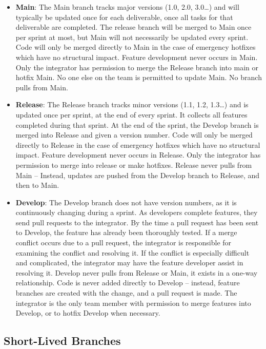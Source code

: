  \begin{itemize}
    \item \textbf{Main}:
    The Main branch tracks major versions (1.0, 2.0, 3.0…) and will typically be updated once for each deliverable, once all tasks for that deliverable are completed. The release branch will be merged to Main once per sprint at most, but Main will not necessarily be updated every sprint. Code will only be merged directly to Main in the case of emergency hotfixes which have no structural impact. Feature development never occurs in Main. Only the integrator has permission to merge the Release branch into main or hotfix Main. No one else on the team is permitted to update Main. No branch pulls from Main.
    \item \textbf{Release}:
    The Release branch tracks minor versions (1.1, 1.2, 1.3…) and is updated once per sprint, at the end of every sprint. It collects all features completed during that sprint. At the end of the sprint, the Develop branch is merged into Release and given a version number. Code will only be merged directly to Release in the case of emergency hotfixes which have no structural impact. Feature development never occurs in Release. Only the integrator has permission to merge into release or make hotfixes. Release never pulls from Main – Instead, updates are pushed from the Develop branch to Release, and then to Main.

    \item \textbf{Develop}:
    The Develop branch does not have version numbers, as it is continuously changing during a sprint. As developers complete features, they send pull requests to the integrator. By the time a pull request has been sent to Develop, the feature has already been thoroughly tested. If a merge conflict occurs due to a pull request, the integrator is responsible for examining the conflict and resolving it. If the conflict is especially difficult and complicated, the integrator may have the feature developer assist in resolving it. Develop never pulls from Release or Main, it exists in a one-way relationship. Code is never added directly to Develop – instead, feature branches are created with the change, and a pull request is made. The integrator is the only team member with permission to merge features into Develop, or to hotfix Develop when necessary.
 \end{itemize}

 \subsection{Short-Lived Branches}

